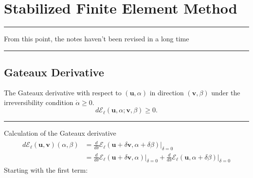 \documentclass[12pt,3p]{article}
\numberwithin{equation}{section}
\begin{document}
\iffalse
\section{Stabilized Finite Element Method}
\noindent\rule{\linewidth}{0.5pt} %
From this point, the notes haven't been revised in a long time \\
\noindent\rule{\linewidth}{0.5pt} %

\subsection{Gateaux Derivative}
The Gateaux derivative with respect to $(\bm{u},\alpha)$ in direction $(\bm{v}, \beta)$ under the irreversibility condition $\dot{\alpha}\ge0$.
\begin{equation}
d\mathcal{E}_\ell \left(\bm{u}, \alpha; \bm{v}, \beta\right) \ge 0.
\end{equation}
\noindent\rule{\linewidth}{0.5pt} %
Calculation of the Gateaux derivative
\begin{align*}
\begin{split}
d\mathcal{E}_\ell (\bm{u}, \bm{v}) (\alpha, \beta) &= \frac{d}{d \delta} \mathcal{E}_\ell (\bm{u} + \delta \bm{v}, \alpha + \delta \beta) \big\rvert_{\delta = 0} \\
	&= \frac{d}{d \delta} \mathcal{E}_\ell (\bm{u} + \delta \bm{v}, \alpha) \big\rvert_{\delta = 0} + \frac{d}{d \delta} \mathcal{E}_\ell (\bm{u}, \alpha + \delta \beta) \big\rvert_{\delta = 0}
\end{split}
\end{align*}
Starting with the first term: 
\end{document}
